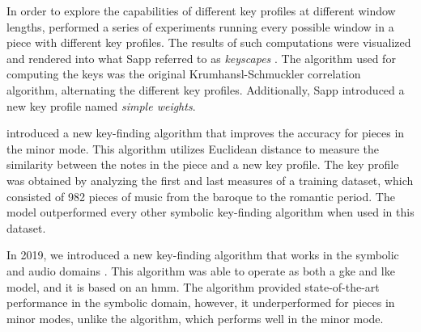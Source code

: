 


In order to explore the capabilities of different key
profiles at different window lengths,
\textcite{sapp2011computational} performed a series of
experiments running every possible window in a piece with
different key profiles. The results of such computations
were visualized and rendered into what Sapp referred to as
\emph{keyscapes} \parencite{sapp2001harmonic}. The algorithm
used for computing the keys was the original
Krumhansl-Schmuckler correlation algorithm, alternating the
different key profiles. Additionally, Sapp introduced a new
key profile named \emph{simple weights}.

\textcite{albrecht2013use} introduced a new key-finding
algorithm that improves the accuracy for pieces in the minor
mode. This algorithm utilizes Euclidean distance to measure
the similarity between the notes in the piece and a new key
profile. The key profile was obtained by analyzing the first
and last measures of a training dataset, which consisted of
982 pieces of music from the baroque to the romantic period.
The model outperformed every other symbolic key-finding
algorithm when used in this dataset.




In 2019, we introduced a new key-finding algorithm that
works in the symbolic and audio domains
\parencite{napoleslopez2019keyfinding}. This algorithm was
able to operate as both a \gls{gke} and \gls{lke} model, and
it is based on an \gls{hmm}. The algorithm provided
state-of-the-art performance in the symbolic domain,
however, it underperformed for pieces in minor modes, unlike
the \textcite{albrecht2013use} algorithm, which performs
well in the minor mode.

